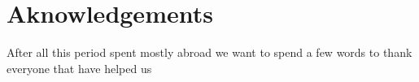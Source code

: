 \chapter*{Aknowledgements}


After all this period spent mostly abroad we want to spend a few words to thank everyone that have helped us 
